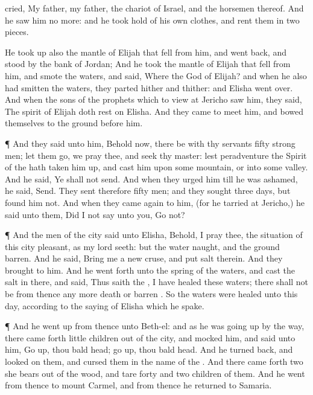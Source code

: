 {cried, My
father, my
father, the
chariot of
Israel, and the
horsemen thereof. And he
saw him no more: and he took
hold of his own
clothes, and
rent them in
two
pieces.
\par }{\PP {}He took
up also the
mantle of
Elijah that
fell from him, and went
back, and
stood by the
bank of
Jordan;
And he
took the
mantle of
Elijah that
fell from him, and
smote the
waters, and
said, Where
{} the
{}
God of
Elijah? and when he also had
smitten the
waters, they
parted hither and thither: and
Elisha went
over.
And when the
sons of the
prophets which
{} to view at
Jericho
saw him, they
said, The
spirit of
Elijah doth
rest on
Elisha. And they
came to
meet him, and
bowed themselves to the
ground before him.
\par }{\PP {}¶ And they
said unto him, Behold now, there
be with thy
servants
fifty
strong
men; let them
go, we pray thee, and
seek thy
master: lest peradventure the
Spirit of the
{} hath taken him
up, and
cast him upon
some
mountain, or into
some
valley. And he
said, Ye shall not
send.
And when they
urged him till he was
ashamed, he
said,
Send. They
sent therefore
fifty
men; and they
sought
three
days, but
found him not.
And when they came
again to him, (for he
tarried at
Jericho,) he
said unto them, Did I not
say unto you,
Go not?
\par }{\PP {}¶ And the
men of the
city
said unto
Elisha, Behold, I pray thee, the
situation of this
city
{}
pleasant, as my
lord
seeth: but the
water
{}
naught, and the
ground
barren.
And he
said,
Bring me a
new
cruse, and
put
salt therein. And they
brought
{} to him.
And he went
forth unto the
spring of the
waters, and
cast the
salt in there, and
said, Thus
saith the
{}, I have
healed these
waters; there shall not be from thence any more
death or
barren
{}.
So the
waters were
healed unto this
day, according to the
saying of
Elisha which he
spake.
\par }{\PP {}¶ And he went
up from thence unto
Beth-el: and as he was going
up by the
way, there came
forth
little
children out of the
city, and
mocked him, and
said unto him, Go
up, thou bald
head; go
up, thou bald
head.
And he
turned
back, and
looked on them, and
cursed them in the
name of the
{}. And there came
forth
two she
bears out of the
wood, and
tare
forty and
two
children of them.
And he
went from thence to
mount
Carmel, and from thence he
returned to
Samaria.

}
